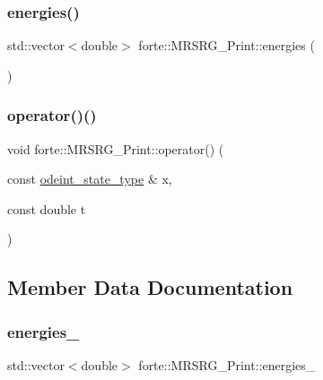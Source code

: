 \subsubsection{\texorpdfstring{energies()}{energies()}}
{\footnotesize\ttfamily std\+::vector$<$double$>$ forte\+::\+M\+R\+S\+R\+G\+\_\+\+Print\+::energies (\begin{DoxyParamCaption}{ }\end{DoxyParamCaption})\hspace{0.3cm}{\ttfamily [inline]}}

\mbox{\label{classforte_1_1_m_r_s_r_g___print_a6f6d0a47245b1c9adf4be7e4590a9ff0}} 
\subsubsection{\texorpdfstring{operator()()}{operator()()}}
{\footnotesize\ttfamily void forte\+::\+M\+R\+S\+R\+G\+\_\+\+Print\+::operator() (\begin{DoxyParamCaption}\item[{const \mbox{\hyperlink{namespaceforte_ad8fa2d4b40cee55f959c09c9be68a63e}{odeint\+\_\+state\+\_\+type}} \&}]{x,  }\item[{const double}]{t }\end{DoxyParamCaption})}



\subsection{Member Data Documentation}
\mbox{\label{classforte_1_1_m_r_s_r_g___print_abaaecdd3c6224840deee86a02e340ea5}} 
\subsubsection{\texorpdfstring{energies\+\_\+}{energies\_}}
{\footnotesize\ttfamily std\+::vector$<$double$>$ forte\+::\+M\+R\+S\+R\+G\+\_\+\+Print\+::energies\+\_\+\hspace{0.3cm}{\ttfamily [protected]}}

